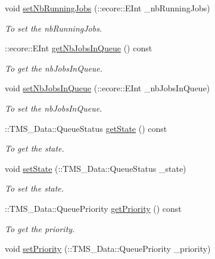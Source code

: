 \begin{DoxyCompactItemize}
void \hyperlink{classTMS__Data_1_1Queue_a01d98028657df5731e33476408d053f2}{setNbRunningJobs} (::ecore::EInt \_\-nbRunningJobs)
\begin{DoxyCompactList}\small\item\em To set the nbRunningJobs. \item\end{DoxyCompactList}\item 
::ecore::EInt \hyperlink{classTMS__Data_1_1Queue_a52155a1846c81a6190a2a0d6cd8aedb0}{getNbJobsInQueue} () const 
\begin{DoxyCompactList}\small\item\em To get the nbJobsInQueue. \item\end{DoxyCompactList}\item 
void \hyperlink{classTMS__Data_1_1Queue_a1ddea8187e7e4323b4cb98d1b6a87ddd}{setNbJobsInQueue} (::ecore::EInt \_\-nbJobsInQueue)
\begin{DoxyCompactList}\small\item\em To set the nbJobsInQueue. \item\end{DoxyCompactList}\item 
::TMS\_\-Data::QueueStatus \hyperlink{classTMS__Data_1_1Queue_a79b3347bc0fbb43fc07290fe98ed13e7}{getState} () const 
\begin{DoxyCompactList}\small\item\em To get the state. \item\end{DoxyCompactList}\item 
void \hyperlink{classTMS__Data_1_1Queue_a20ecdf743d90e05c9a7b6d2e449e32ad}{setState} (::TMS\_\-Data::QueueStatus \_\-state)
\begin{DoxyCompactList}\small\item\em To set the state. \item\end{DoxyCompactList}\item 
::TMS\_\-Data::QueuePriority \hyperlink{classTMS__Data_1_1Queue_a86ddcf0951c1b0d7e72181c07a4f04d1}{getPriority} () const 
\begin{DoxyCompactList}\small\item\em To get the priority. \item\end{DoxyCompactList}\item 
void \hyperlink{classTMS__Data_1_1Queue_a429e851d067fd320f5b3424264d659cd}{setPriority} (::TMS\_\-Data::QueuePriority \_\-priority)

\end{DoxyCompactItemize}
